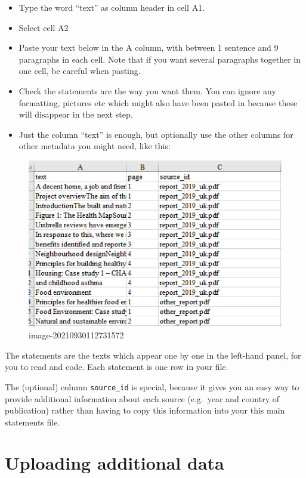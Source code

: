 \documentclass[
]{book}
\providecommand{\tightlist}{%
  \setlength{\itemsep}{0pt}\setlength{\parskip}{0pt}}
\begin{document}
\begin{itemize}
\tightlist
\item
  Type the word ``text'' as column header in cell A1.
\item
  Select cell A2
\item
  Paste your text below in the A column, with between 1 sentence and 9 paragraphs in each cell. Note that if you want several paragraphs together in one cell, be careful when pasting.
\item
  Check the statements are the way you want them. You can ignore any formatting, pictures etc which might also have been pasted in because these will disappear in the next step.
\item
  Just the column ``text'' is enough, but optionally use the other columns for other metadata you might need, like this:
\end{itemize}

\begin{figure}
\centering
\includegraphics{_assets/image-20210930112731572.png}
\caption{image-20210930112731572}
\end{figure}

The statements are the texts which appear one by one in the left-hand panel, for you to read and code. Each statement is one row in your file.

The (optional) column \texttt{source\_id} is special, because it gives you an easy way to provide additional information about each source (e.g.~year and country of publication) rather than having to copy this information into your this main statements file.

\hypertarget{import-additional-data}{%
\chapter{Uploading additional data}\label{import-additional-data}}
\end{document}
